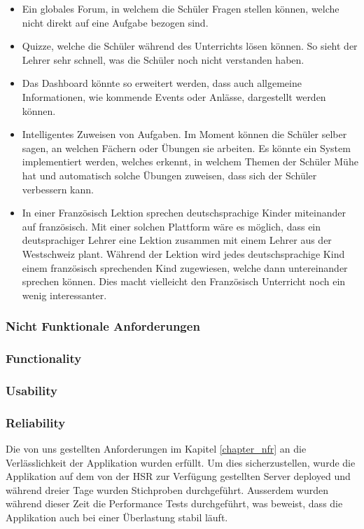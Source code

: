 \begin{itemize}
	\item Ein globales Forum, in welchem die Schüler Fragen stellen können, welche nicht direkt auf eine Aufgabe bezogen sind.
	\item Quizze, welche die Schüler während des Unterrichts lösen können. So sieht der Lehrer sehr schnell, was die Schüler noch nicht verstanden haben.
	\item Das Dashboard könnte so erweitert werden, dass auch allgemeine Informationen, wie kommende Events oder Anlässe, dargestellt werden können.
	\item Intelligentes Zuweisen von Aufgaben. Im Moment können die Schüler selber sagen, an welchen Fächern oder Übungen sie arbeiten. Es könnte ein System implementiert werden, welches erkennt, in welchem Themen der Schüler Mühe hat und automatisch solche Übungen zuweisen, dass sich der Schüler verbessern kann.
	\item In einer Französisch Lektion sprechen deutschsprachige Kinder miteinander auf französisch.	Mit einer solchen Plattform wäre es möglich, dass ein deutsprachiger Lehrer eine Lektion zusammen mit einem Lehrer aus der Westschweiz plant. Während der Lektion wird jedes deutschsprachige Kind einem französisch sprechenden Kind zugewiesen, welche dann untereinander sprechen können. Dies macht vielleicht den Französisch Unterricht noch ein wenig interessanter.
\end{itemize}


\subsubsection{Nicht Funktionale Anforderungen}

\subsubsection*{Functionality}

\subsubsection*{Usability}

\subsubsection*{Reliability}
Die von uns gestellten Anforderungen im Kapitel \ref{chapter_nfr} an die Verlässlichkeit der Applikation wurden erfüllt. Um dies sicherzustellen, wurde die Applikation auf dem von der HSR zur Verfügung gestellten Server deployed und während dreier Tage wurden Stichproben durchgeführt. Ausserdem wurden während dieser Zeit die Performance Tests durchgeführt, was beweist, dass die Applikation auch bei einer Überlastung stabil läuft.

